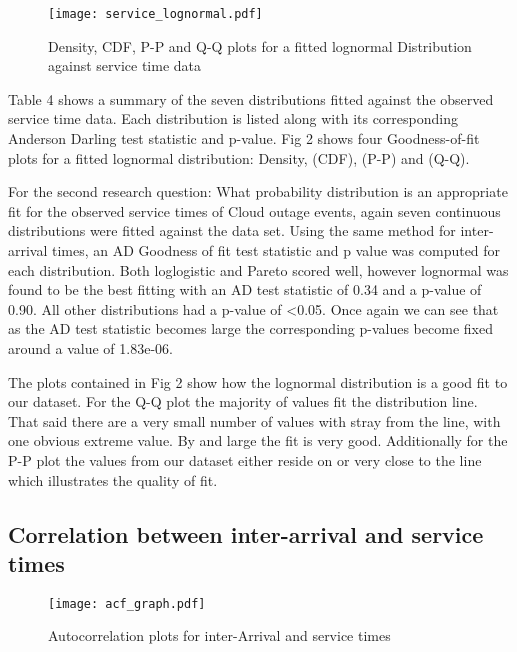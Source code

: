 \documentclass[5p]{elsarticle}
\begin{document}
\begin{figure*}[]
\begin{center}
\texttt{[image: service\_lognormal.pdf]} 
\caption{Density, CDF, P-P and Q-Q plots for a fitted lognormal Distribution against service time data}
\end{center}
\label{fig:outagedistribution}
\end{figure*}


Table 4 shows a summary of the seven distributions fitted against the observed service time data. Each distribution is listed along with its corresponding Anderson Darling test statistic and p-value. Fig 2 shows four Goodness-of-fit plots for a fitted lognormal distribution: Density, (CDF), (P-P)  and (Q-Q).  

For the second research question: What probability distribution is an appropriate fit for the observed service times of Cloud outage events, again seven continuous distributions were fitted against the data set. Using the same method for inter-arrival times, an AD Goodness of fit test statistic and p value was computed for each distribution. Both loglogistic and Pareto scored well, however lognormal was found to be the best fitting with an AD test statistic of 0.34 and a p-value of 0.90. All other distributions had a p-value of \textless 0.05. Once again we can see that as the AD test statistic becomes large the corresponding p-values become fixed around a value of 1.83e-06.

The plots contained in Fig 2 show how the lognormal distribution is a good fit to our dataset. For the Q-Q plot the majority of values fit the distribution line. That said there are a very small number of values with stray from the line, with one obvious extreme value. By and large the fit is very good. Additionally for the P-P plot the values from our dataset either reside on or very close to the line which illustrates the quality of fit.

\subsection{Correlation between inter-arrival and service times}

\begin{figure*}[]
\begin{center}
\texttt{[image: acf\_graph.pdf]} 
\caption{Autocorrelation plots for inter-Arrival and service times}
\end{center}
\label{fig:acfgraphs}
\end{figure*}
\end{document}
